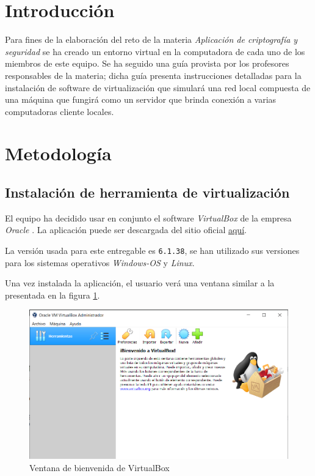 \documentclass{article}
\begin{document}
    \tableofcontents
    \clearpage

    \section{Introducción}
        
        Para fines de la elaboración del reto de la materia \emph{Aplicación de criptografía y seguridad} se ha creado un entorno virtual en la computadora de cada uno de los miembros de este equipo. Se ha seguido una guía provista por los profesores responsables de la materia; dicha guía presenta instrucciones detalladas para la instalación de software de virtualización que simulará una red local compuesta de una máquina que fungirá como un servidor que brinda conexión a varias computadoras cliente locales.

    \section{Metodología}

        \subsection{Instalación de herramienta de virtualización}

            El equipo ha decidido usar en conjunto el software \emph{VirtualBox} de la empresa \emph{Oracle} \cite{vbox-doc}. La aplicación puede ser descargada del sitio oficial \href{https://www.virtualbox.org/wiki/Downloads}{aquí}.

            La versión usada para este entregable es \texttt{6.1.38}, se han utilizado sus versiones para los sistemas operativos \emph{Windows-OS} y \emph{Linux}.

            Una vez instalada la aplicación, el usuario verá una ventana similar a la presentada en la figura \ref{fig:fresh-vbox}.
            \begin{figure}[!htbp]
                \centering
                \includegraphics[scale=0.25]{img/virtual-box.png}
                \caption{Ventana de bienvenida de VirtualBox}
                \label{fig:fresh-vbox}
            \end{figure}
\end{document}
